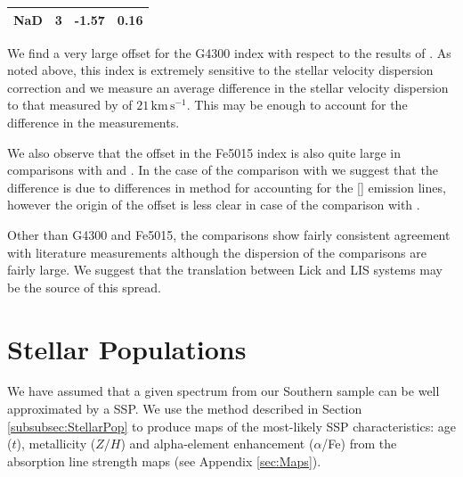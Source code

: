 \documentclass[a4paper,fleqn,usenatbib]{mnras}
\begin{document}
\begin{table}
\begin{tabular}{l r r r}
				NaD 		& 3 		& -1.57\leavevmode\phantom{0}& 0.16\leavevmode\phantom{0}	\\
				\hline
				\hline
			\end{tabular}
		\end{table}

		We find a very large offset for the G4300 index with respect to the results of \citet{Rampazzo2005}. As noted above, this index is extremely sensitive to the stellar velocity dispersion correction and we measure an average difference in the stellar velocity dispersion to that measured by \citet{Rampazzo2005} of $21\,\mathrm{km\,s^{-1}}$. This may be enough to account for the difference in the measurements.

		We also observe that the offset in the Fe5015 index is also quite large in comparisons with \citet{Rampazzo2005} and \citet{Vazdekis2010}. In the case of the comparison with \citet{Rampazzo2005} we suggest that the difference is due to differences in method for accounting for the [] emission lines, however the origin of the offset is less clear in case of the comparison with \citet{Vazdekis2010}. 

		Other than G4300 and Fe5015, the comparisons show fairly consistent agreement with literature measurements although the dispersion of the comparisons are fairly large. We suggest that the translation between Lick and LIS systems may be the source of this spread.

\section{Stellar Populations}
	\label{sec:stellarPop}
	We have assumed that a given spectrum from our Southern sample can be well approximated by a SSP. We use the method described in Section \ref{subsubsec:StellarPop} to produce maps of the most-likely SSP characteristics: age ($t$), metallicity ($Z/H$) and alpha-element enhancement ($\alpha$/Fe) from the absorption line strength maps (see Appendix \ref{sec:Maps}).
\end{document}
